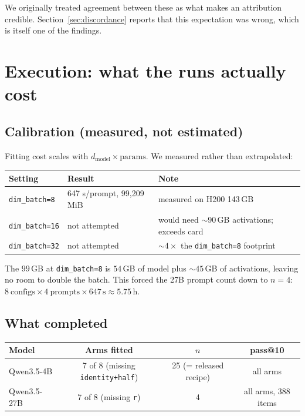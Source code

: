 \documentclass[11pt,a4paper]{article}
\newcommand{\cfg}[1]{\texttt{#1}}
\begin{document}
\noindent
We originally treated agreement between these as what makes an attribution credible.
Section~\ref{sec:discordance} reports that this expectation was wrong, which is
itself one of the findings.

\section{Execution: what the runs actually cost}

\subsection{Calibration (measured, not estimated)}

Fitting cost scales with $d_{\text{model}} \times \text{params}$. We measured rather
than extrapolated:

\begin{center}
\begin{tabular}{@{}lll@{}}
\toprule
\textbf{Setting} & \textbf{Result} & \textbf{Note} \\
\midrule
\cfg{dim\_batch=8}  & 647 s/prompt, 99{,}209 MiB & measured on H200 143\,GB \\
\cfg{dim\_batch=16} & not attempted & would need $\sim$90\,GB activations; exceeds card \\
\cfg{dim\_batch=32} & not attempted & $\sim4\times$ the \cfg{dim\_batch=8} footprint \\
\bottomrule
\end{tabular}
\end{center}

\noindent
The $99$\,GB at \cfg{dim\_batch=8} is $54$\,GB of model plus $\sim45$\,GB of
activations, leaving no room to double the batch. This forced the 27B prompt count
down to $n=4$: $8\ \text{configs} \times 4\ \text{prompts} \times 647\,\text{s}
\approx 5.75$\,h.

\subsection{What completed}

\begin{center}
\begin{tabular}{@{}lccc@{}}
\toprule
\textbf{Model} & \textbf{Arms fitted} & \textbf{$n$} & \textbf{pass@10} \\
\midrule
Qwen3.5-4B  & 7 of 8 (missing \cfg{identity+half}) & 25 (= released recipe) & all arms \\
Qwen3.5-27B & 7 of 8 (missing \cfg{r})             & 4                      & all arms, 388 items \\
\bottomrule
\end{tabular}
\end{center}
\end{document}

